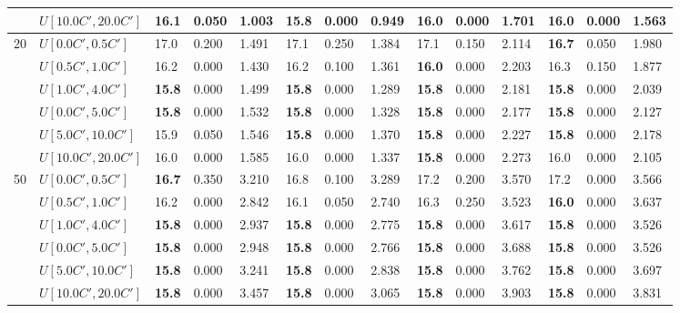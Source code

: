 \begin{table}[h]
{\begin{tabular}{|l|l||l|l|l||l|l|l||l|l|l||l|l|l|}
       & $U[10.0C',20.0C']$ & 16.1 & 0.050 & 1.003 & \textbf{15.8} & 0.000 & 0.949 & 16.0 & 0.000 & 1.701 & 16.0 & 0.000 & 1.563 \\
      \hline\hline
      \multirow{6}{*}{20} & $U[0.0C',0.5C']$ & 17.0 & 0.200 & 1.491 & 17.1 & 0.250 & 1.384 & 17.1 & 0.150 & 2.114 & \textbf{16.7} & 0.050 & 1.980 \\
       & $U[0.5C',1.0C']$ & 16.2 & 0.000 & 1.430 & 16.2 & 0.100 & 1.361 & \textbf{16.0} & 0.000 & 2.203 & 16.3 & 0.150 & 1.877 \\
       & $U[1.0C',4.0C']$ & \textbf{15.8} & 0.000 & 1.499 & \textbf{15.8} & 0.000 & 1.289 & \textbf{15.8} & 0.000 & 2.181 & \textbf{15.8} & 0.000 & 2.039 \\
       & $U[0.0C',5.0C']$ & \textbf{15.8} & 0.000 & 1.532 & \textbf{15.8} & 0.000 & 1.328 & \textbf{15.8} & 0.000 & 2.177 & \textbf{15.8} & 0.000 & 2.127 \\
       & $U[5.0C',10.0C']$ & 15.9 & 0.050 & 1.546 & \textbf{15.8} & 0.000 & 1.370 & \textbf{15.8} & 0.000 & 2.227 & \textbf{15.8} & 0.000 & 2.178 \\
       & $U[10.0C',20.0C']$ & 16.0 & 0.000 & 1.585 & 16.0 & 0.000 & 1.337 & \textbf{15.8} & 0.000 & 2.273 & 16.0 & 0.000 & 2.105 \\
      \hline\hline
      \multirow{6}{*}{50} & $U[0.0C',0.5C']$ & \textbf{16.7} & 0.350 & 3.210 & 16.8 & 0.100 & 3.289 & 17.2 & 0.200 & 3.570 & 17.2 & 0.000 & 3.566 \\
       & $U[0.5C',1.0C']$ & 16.2 & 0.000 & 2.842 & 16.1 & 0.050 & 2.740 & 16.3 & 0.250 & 3.523 & \textbf{16.0} & 0.000 & 3.637 \\
       & $U[1.0C',4.0C']$ & \textbf{15.8} & 0.000 & 2.937 & \textbf{15.8} & 0.000 & 2.775 & \textbf{15.8} & 0.000 & 3.617 & \textbf{15.8} & 0.000 & 3.526 \\
       & $U[0.0C',5.0C']$ & \textbf{15.8} & 0.000 & 2.948 & \textbf{15.8} & 0.000 & 2.766 & \textbf{15.8} & 0.000 & 3.688 & \textbf{15.8} & 0.000 & 3.526 \\
       & $U[5.0C',10.0C']$ & \textbf{15.8} & 0.000 & 3.241 & \textbf{15.8} & 0.000 & 2.838 & \textbf{15.8} & 0.000 & 3.762 & \textbf{15.8} & 0.000 & 3.697 \\
       & $U[10.0C',20.0C']$ & \textbf{15.8} & 0.000 & 3.457 & \textbf{15.8} & 0.000 & 3.065 & \textbf{15.8} & 0.000 & 3.903 & \textbf{15.8} & 0.000 & 3.831 \\
      \hline
      \end{tabular}
      }
      \label{tab:pcpn90p9ILPVariant}\end{table}
      
